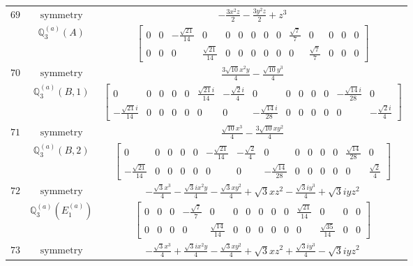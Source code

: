 \documentclass[fleqn,8pt,landscape]{jsarticle}
\begin{document}
\begin{longtable}{ccc}
$ 69 $ & $ \text{symmetry} $ & $ - \frac{3 x^{2} z}{2} - \frac{3 y^{2} z}{2} + z^{3} $ \\
$  $ & $ \mathbb{Q}_{3}^{(a)}(A) $ & $ \begin{bmatrix} 0 & 0 & - \frac{\sqrt{21}}{14} & 0 & 0 & 0 & 0 & 0 & 0 & \frac{\sqrt{7}}{7} & 0 & 0 & 0 & 0 \\ 0 & 0 & 0 & \frac{\sqrt{21}}{14} & 0 & 0 & 0 & 0 & 0 & 0 & \frac{\sqrt{7}}{7} & 0 & 0 & 0 \end{bmatrix} $ \\ \hline
$ 70 $ & $ \text{symmetry} $ & $ \frac{3 \sqrt{10} x^{2} y}{4} - \frac{\sqrt{10} y^{3}}{4} $ \\
$  $ & $ \mathbb{Q}_{3}^{(a)}(B,1) $ & $ \begin{bmatrix} 0 & 0 & 0 & 0 & 0 & \frac{\sqrt{21} i}{14} & - \frac{\sqrt{2} i}{4} & 0 & 0 & 0 & 0 & 0 & - \frac{\sqrt{14} i}{28} & 0 \\ - \frac{\sqrt{21} i}{14} & 0 & 0 & 0 & 0 & 0 & 0 & - \frac{\sqrt{14} i}{28} & 0 & 0 & 0 & 0 & 0 & - \frac{\sqrt{2} i}{4} \end{bmatrix} $ \\ \hline
$ 71 $ & $ \text{symmetry} $ & $ \frac{\sqrt{10} x^{3}}{4} - \frac{3 \sqrt{10} x y^{2}}{4} $ \\
$  $ & $ \mathbb{Q}_{3}^{(a)}(B,2) $ & $ \begin{bmatrix} 0 & 0 & 0 & 0 & 0 & - \frac{\sqrt{21}}{14} & - \frac{\sqrt{2}}{4} & 0 & 0 & 0 & 0 & 0 & \frac{\sqrt{14}}{28} & 0 \\ - \frac{\sqrt{21}}{14} & 0 & 0 & 0 & 0 & 0 & 0 & - \frac{\sqrt{14}}{28} & 0 & 0 & 0 & 0 & 0 & \frac{\sqrt{2}}{4} \end{bmatrix} $ \\ \hline
$ 72 $ & $ \text{symmetry} $ & $ - \frac{\sqrt{3} x^{3}}{4} - \frac{\sqrt{3} i x^{2} y}{4} - \frac{\sqrt{3} x y^{2}}{4} + \sqrt{3} x z^{2} - \frac{\sqrt{3} i y^{3}}{4} + \sqrt{3} i y z^{2} $ \\
$  $ & $ \mathbb{Q}_{3}^{(a)}(E_{1}^{(a)}) $ & $ \begin{bmatrix} 0 & 0 & 0 & - \frac{\sqrt{7}}{7} & 0 & 0 & 0 & 0 & 0 & 0 & \frac{\sqrt{21}}{14} & 0 & 0 & 0 \\ 0 & 0 & 0 & 0 & \frac{\sqrt{14}}{14} & 0 & 0 & 0 & 0 & 0 & 0 & \frac{\sqrt{35}}{14} & 0 & 0 \end{bmatrix} $ \\ \hline
$ 73 $ & $ \text{symmetry} $ & $ - \frac{\sqrt{3} x^{3}}{4} + \frac{\sqrt{3} i x^{2} y}{4} - \frac{\sqrt{3} x y^{2}}{4} + \sqrt{3} x z^{2} + \frac{\sqrt{3} i y^{3}}{4} - \sqrt{3} i y z^{2} $ \\

\end{longtable}
\end{document}
